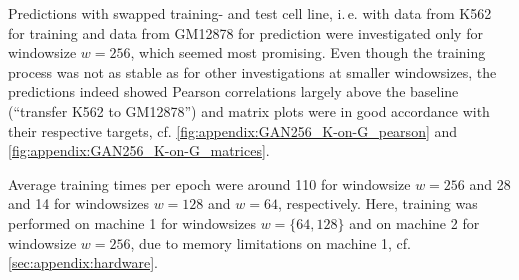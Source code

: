 Predictions with swapped training- and test cell line, i.\,e. with data from K562 for training and data from GM12878 for prediction 
were investigated only for windowsize $w=256$, which seemed most promising. 
Even though the training process was not as stable as for other investigations at smaller windowsizes, 
the predictions indeed showed Pearson correlations largely above the baseline (``transfer K562 to GM12878'') 
and matrix plots were in good accordance with their respective targets, cf. \cref{fig:appendix:GAN256_K-on-G_pearson} and \ref{fig:appendix:GAN256_K-on-G_matrices}.

Average training times per epoch were around \SI{110}{\min} for windowsize $w=256$
and \SI{28}{\min} and \SI{14}{\min} for windowsizes $w=128$ and $w=64$, respectively.
Here, training was performed on machine 1 for windowsizes $w=\{64,128\}$ and on machine 2 for windowsize $w=256$,
due to memory limitations on machine 1, cf. \cref{sec:appendix:hardware}.

